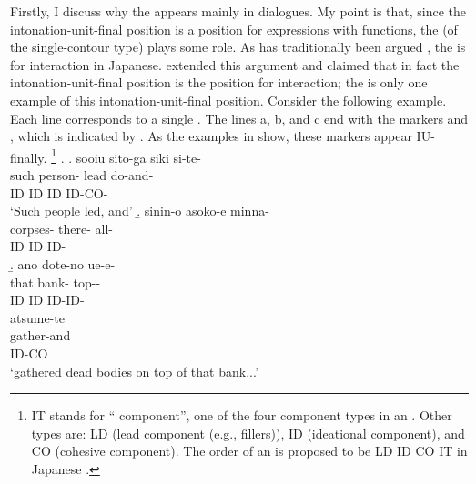 Firstly, I discuss why the  appears mainly in dialogues.
My point is that,
since the intonation-unit-final position is a position for expressions with  functions,
the  (of the single-contour type) plays some  role.
As has traditionally been argued \cite[e.g.,][]{watanabe71},
the  is for interaction in Japanese.
 extended this argument and claimed that
in fact the intona\-tion-unit-final position is the position for interaction;
the  is only one example of this intonation-unit-final position.
Consider the following example.
Each line corresponds to a single .
The lines a, b, and c end with the  markers  and ,
which is indicated by .
As the examples in \Next show,
these  markers appear IU-finally.%
	\footnote{
	IT stands for `` component'',
	one of the four component types in an .
	Other types are:
	LD (lead component (e.g., fillers)),
	ID (ideational component), and
	CO (cohesive component).
	The order of an  is proposed to be
	LD ID CO IT in Japanese \cite[][44]{iwasaki93}.
	}
%
\ex.
 \a.
 \glll sooiu sito-ga siki si-te- \\
 	such person- lead do-and- \\
	ID ID ID ID-CO-	 \\
	\glt `Such people led, and'
 \b.
 \glll sinin-o asoko-e minna- \\
 		corpses- there- all- \\
		ID ID ID- \\
 \b.
 \glll ano dote-no ue-e- \\
 		that bank- top-- \\
		ID ID ID-ID- \\
 \glll atsume-te \\
 		gather-and \\
		ID-CO \\
	\glt `gathered dead bodies on top of that bank...'
	\hfill{\cite[][47, gloss and transcription modified by the current author]{iwasaki93}}

